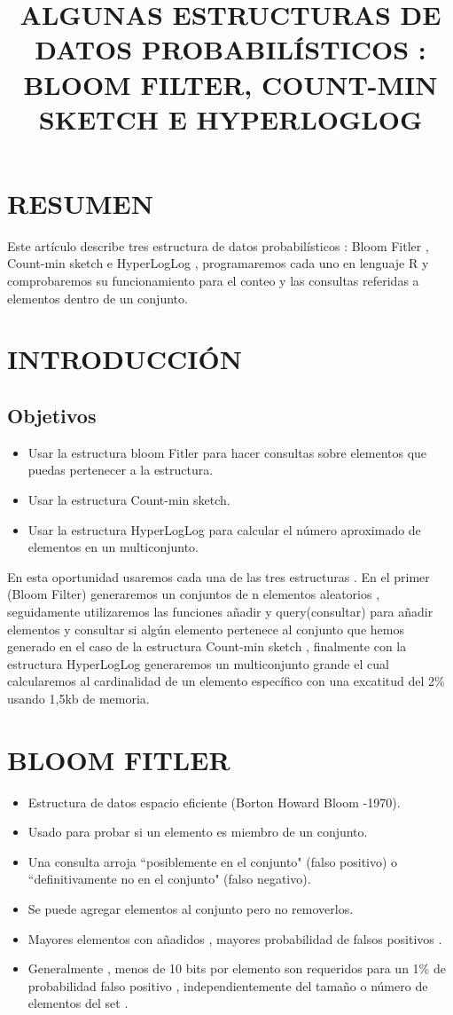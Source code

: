 \documentclass{article}
\title{\bf ALGUNAS ESTRUCTURAS DE DATOS PROBABILÍSTICOS : BLOOM FILTER, COUNT-MIN SKETCH E HYPERLOGLOG}
\date{}
\begin{document}
\begin{multicols*}{2}
[
\maketitle
]
\section{RESUMEN} 
Este artículo describe tres estructura de datos probabilísticos : Bloom Fitler , Count-min sketch e HyperLogLog , programaremos cada uno en lenguaje R y comprobaremos su funcionamiento para el conteo y las consultas referidas a elementos dentro de un conjunto.
\section{INTRODUCCIÓN}
\subsection{Objetivos}
\begin{itemize}
    \item Usar la estructura bloom Fitler para hacer consultas sobre elementos que puedas pertenecer a la estructura. 
    \item Usar la estructura Count-min sketch.
    \item Usar la estructura HyperLogLog para calcular el número aproximado de elementos en un multiconjunto. 
\end{itemize}
En esta oportunidad usaremos cada una de las tres estructuras  . En el primer (Bloom Filter) generaremos un conjuntos de n elementos aleatorios , seguidamente utilizaremos las funciones añadir y query(consultar) para añadir elementos y consultar si algún elemento pertenece al conjunto que hemos generado en el caso de la estructura Count-min sketch , finalmente con la estructura HyperLogLog generaremos un multiconjunto grande el cual calcularemos al cardinalidad de un elemento específico con una excatitud del 2\% usando 1,5kb de memoria.
\section{BLOOM FITLER}
\begin{itemize}
    \item Estructura de datos espacio eficiente (Borton Howard Bloom -1970).
    \item Usado para probar si un elemento es miembro de un conjunto.
    \item Una consulta arroja ``posiblemente en el conjunto" (falso positivo)  o ``definitivamente no en el conjunto" (falso negativo).
    \item Se puede agregar elementos al conjunto pero no removerlos.
    \item Mayores elementos con añadidos , mayores probabilidad de falsos positivos .
    \item Generalmente , menos de 10 bits por elemento son requeridos para un 1\% de probabilidad falso positivo , independientemente del tamaño o número de elementos del set .


\end{itemize}
\end{multicols*}
\end{document}

